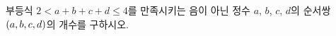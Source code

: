 부등식 $2<a+b+c+d\le 4$를 만족시키는 음이 아닌 정수 $a$, $b$, $c$, $d$의 순서쌍 $(a{,}\mkern3mu\mathopen{}b{,}\mkern3mu\mathopen{}c{,}\mkern3mu\mathopen{}d)$의 개수를 구하시오.
